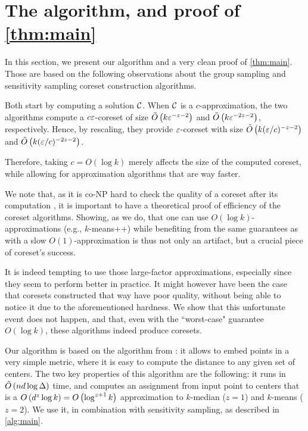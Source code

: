 \section{The algorithm, and proof of \cref{thm:main}}

In this section, we present our algorithm and a very clean proof of \cref{thm:main}. Those are based on the following observations about the group
sampling \cite{stoc21} and sensitivity sampling \cite{FeldmanL11} coreset construction algorithms.

Both start by computing a solution $\mathcal C$. When $\mathcal C$ is a $c$-approximation, the two algorithms compute a $c \varepsilon$-coreset of size $\tilde O\left(
k \varepsilon^{-z-2}\right)$ and $\tilde O\left( k \varepsilon^{-2z -2}\right)$, respectively. Hence, by rescaling, they provide $\varepsilon$-coreset with size $\tilde O\left(
k (\varepsilon/c)^{-z-2}\right)$ and $\tilde O\left( k (\varepsilon/c)^{-2z-2}\right)$. 

Therefore, taking $c = O(\log k)$ merely affects the size of the computed coreset, while allowing for approximation algorithms that are way faster.

We note that, as it is co-NP hard to check the quality of a coreset after its computation \cite{chrisESA}, it is important to have a theoretical proof of
efficiency of the coreset algorithms.  Showing, as we do, that one can use $O(\log k)$-approximations (e.g., $k$-means++) while benefiting from the same
guarantees as with a slow $O(1)$-approximation is thus not only an artifact, but a crucial piece of coreset's success. 

It is indeed tempting to use those large-factor approximations, especially since they seem to perform better in practice. 
It might however have been the case that coresets constructed that way have poor quality, without being able to notice it due to the aforementioned hardness. 
We show that this unfortunate event does not happen, and that, even with the ``worst-case" guarantee $O(\log k)$, these algorithms indeed produce coresets.

Our algorithm is based on the \fkmeans algorithm from \cite{cohen2020fast}: it allows to embed points in a very simple metric,  where it is easy to compute the
distance to any given set of centers. The two key properties of this algorithm are the following: it runs in $\tilde O\left( n d \log \Delta\right)$ time, and
computes an assignment from input point to centers that is a $O\left( d^z \log k\right) = O\left(\log^{z+1} k\right)$ approximation to $k$-median ($z=1$) and
$k$-means ($z=2$).  We use it, in combination with sensitivity sampling, as described in \cref{alg:main}.


